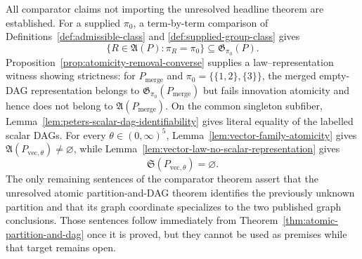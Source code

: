 All comparator claims not importing the unresolved headline theorem are established.  For a supplied \(\pi_0\), a term-by-term comparison of Definitions~\ref{def:admissible-class} and \ref{def:supplied-group-class} gives
\[
 \{R\in\mathfrak A(P):\pi_R=\pi_0\}
 \subseteq \mathfrak G_{\pi_0}(P).
\]
Proposition~\ref{prop:atomicity-removal-converse} supplies a law--representation witness showing strictness: for \(P_{\mathrm{merge}}\) and \(\pi_0=\{\{1,2\},\{3\}\}\), the merged empty-DAG representation belongs to \(\mathfrak G_{\pi_0}(P_{\mathrm{merge}})\) but fails innovation atomicity and hence does not belong to \(\mathfrak A(P_{\mathrm{merge}})\).  On the common singleton subfiber, Lemma~\ref{lem:peters-scalar-dag-identifiability} gives literal equality of the labelled scalar DAGs.  For every \(\theta\in(0,\infty)^5\), Lemma~\ref{lem:vector-family-atomicity} gives \(\mathfrak A(P_{\mathrm{vec},\theta})\ne\varnothing\), while Lemma~\ref{lem:vector-law-no-scalar-representation} gives
\[
 \mathfrak S(P_{\mathrm{vec},\theta})=\varnothing.
\]
The only remaining sentences of the comparator theorem assert that the unresolved atomic partition-and-DAG theorem identifies the previously unknown partition and that its graph coordinate specializes to the two published graph conclusions.  Those sentences follow immediately from Theorem~\ref{thm:atomic-partition-and-dag} once it is proved, but they cannot be used as premises while that target remains open.